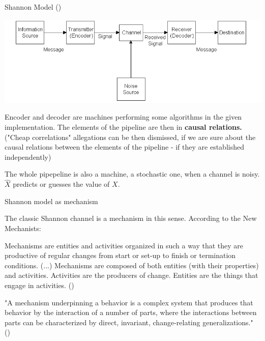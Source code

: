 \documentclass[10pt, aspectratio=169]{beamer}
\begin{document}
\begin{frame}[label=shannon_model]{ Shannon Model (\cite{shannon_mathematical_1948})}

    \includegraphics[width=1\linewidth]{images/latexImage_9d58f9e54772e4e91104b2b791c5c63e.png}
    


Encoder and decoder are  machines performing some algorithms  in the given implementation.
The elements of the pipeline are then in \textbf{causal relations.} ("Cheap correlations" allegations can be then dismissed, if we are sure about the causal relations between the elements of the pipeline - if they are established independently)

    The whole pipepeline is also a machine, a stochastic one, when a channel is noisy.
    {$\hat{X}$} predicts or guesses the value of $X$.
   

\end{frame}


\begin{frame}[label=shannon_mechanism]{Shannon model as mechanism}
 
    The classic Shannon channel is a mechanism in this sense.
    According to the New Mechanists:

    Mechanisms are entities and activities organized in such a way that they are
    productive of regular changes from start or set-up to finish or termination conditions.
    (...)
    Mechanisms are composed of both entities (with their properties) and
    activities. Activities are the producers of change. Entities are the things
    that engage in activities. (\cite{machamer_thinking_2000})

    
    "A mechanism underpinning a behavior is a complex system that produces
    that behavior by the interaction of a number of parts, where the
    interactions between parts can be characterized by direct, invariant,
    change-relating generalizations." (\cite{glennan_rethinking_2002})

   

\end{frame}
\end{document}
